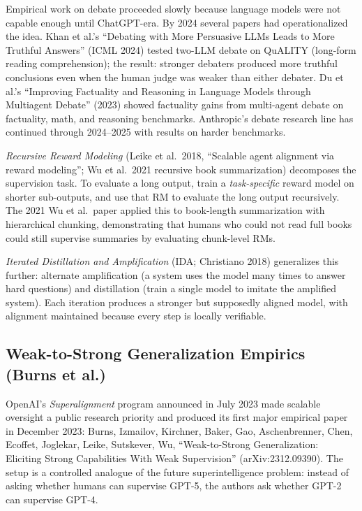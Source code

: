 Empirical work on debate proceeded slowly because language models were not capable enough until ChatGPT-era. By 2024 several papers had operationalized the idea. Khan et al.'s ``Debating with More Persuasive LLMs Leads to More Truthful Answers'' (ICML 2024) tested two-LLM debate on QuALITY (long-form reading comprehension); the result: stronger debaters produced more truthful conclusions even when the human judge was weaker than either debater. Du et al.'s ``Improving Factuality and Reasoning in Language Models through Multiagent Debate'' (2023) showed factuality gains from multi-agent debate on factuality, math, and reasoning benchmarks. Anthropic's debate research line has continued through 2024--2025 with results on harder benchmarks.

\emph{Recursive Reward Modeling} (Leike et al.~2018, ``Scalable agent alignment via reward modeling''; Wu et al.~2021 recursive book summarization) decomposes the supervision task. To evaluate a long output, train a \emph{task-specific} reward model on shorter sub-outputs, and use that RM to evaluate the long output recursively. The 2021 Wu et al.~paper applied this to book-length summarization with hierarchical chunking, demonstrating that humans who could not read full books could still supervise summaries by evaluating chunk-level RMs.

\emph{Iterated Distillation and Amplification} (IDA; Christiano 2018) generalizes this further: alternate amplification (a system uses the model many times to answer hard questions) and distillation (train a single model to imitate the amplified system). Each iteration produces a stronger but supposedly aligned model, with alignment maintained because every step is locally verifiable.

\subsection{Weak-to-Strong Generalization Empirics (Burns et al.)}\label{weak-to-strong-generalization-empirics-burns-et-al.}

OpenAI's \emph{Superalignment} program announced in July 2023 made scalable oversight a public research priority and produced its first major empirical paper in December 2023: Burns, Izmailov, Kirchner, Baker, Gao, Aschenbrenner, Chen, Ecoffet, Joglekar, Leike, Sutskever, Wu, ``Weak-to-Strong Generalization: Eliciting Strong Capabilities With Weak Supervision'' (arXiv:2312.09390). The setup is a controlled analogue of the future superintelligence problem: instead of asking whether humans can supervise GPT-5, the authors ask whether GPT-2 can supervise GPT-4.

